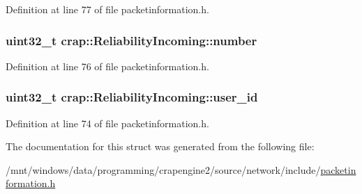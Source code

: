 Definition at line 77 of file packetinformation.\+h.

\hypertarget{structcrap_1_1_reliability_incoming_a581fa65c9a0ebdfd45753b016318a3b5}{}
\subsubsection[{number}]{\setlength{\rightskip}{0pt plus 5cm}uint32\+\_\+t crap\+::\+Reliability\+Incoming\+::number}\label{structcrap_1_1_reliability_incoming_a581fa65c9a0ebdfd45753b016318a3b5}


Definition at line 76 of file packetinformation.\+h.

\hypertarget{structcrap_1_1_reliability_incoming_a7854c79cee5bc4df71d0681b4f4707d8}{}
\subsubsection[{user\+\_\+id}]{\setlength{\rightskip}{0pt plus 5cm}uint32\+\_\+t crap\+::\+Reliability\+Incoming\+::user\+\_\+id}\label{structcrap_1_1_reliability_incoming_a7854c79cee5bc4df71d0681b4f4707d8}


Definition at line 74 of file packetinformation.\+h.



The documentation for this struct was generated from the following file\+:\begin{DoxyCompactItemize}
\item 
/mnt/windows/data/programming/crapengine2/source/network/include/\hyperlink{packetinformation_8h}{packetinformation.\+h}\end{DoxyCompactItemize}
